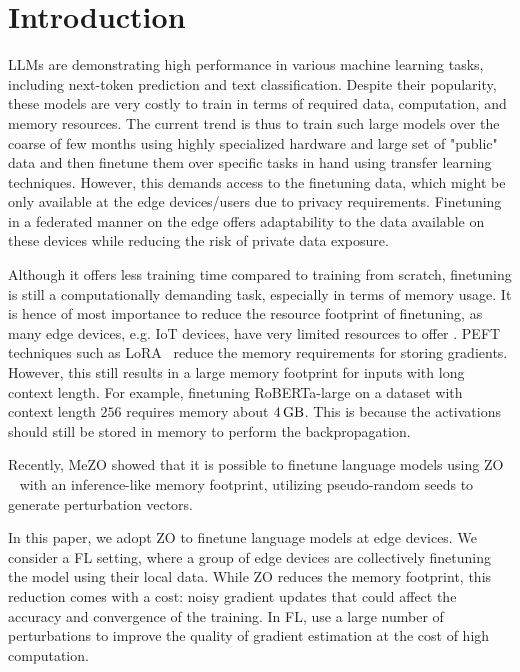 \section{Introduction}

LLMs are demonstrating high performance in various machine learning tasks, including next-token prediction and text classification. Despite their popularity, these models are very costly to train in terms of required data, computation, and memory resources. The current trend is thus to train such large models over the coarse of few months using highly specialized hardware and large set of "public" data and then finetune them over specific tasks in hand using transfer learning techniques. However, this demands access to the finetuning data, which might be only available at the edge devices/users due to privacy requirements. Finetuning in a federated \cite{mcmahan2017communication} manner on the edge offers adaptability to the data available on these devices while reducing the risk of private data exposure.

Although it offers less training time compared to training from scratch, finetuning is still a computationally demanding task, especially in terms of memory usage. It is hence of most importance to reduce the resource footprint of finetuning, as many edge devices, e.g. IoT devices, have very limited resources to offer \cite{Survey_2, pfeiffer2023federated}. \ac{PEFT} techniques such as LoRA~\cite{hu2022lora} reduce the memory requirements for storing gradients. However, this still results in a large memory footprint for inputs with long context length. For example, finetuning RoBERTa-large \cite{roberta_cite} on a dataset with context length $256$ requires memory about $\SI{4}{\giga \byte}$. This is because the activations should still be stored in memory to perform the backpropagation. 

Recently, MeZO \cite{malladi2023fine} showed that it is possible to finetune language models using \ac{ZO} ~\cite{spsa_cite} with an inference-like memory footprint, utilizing pseudo-random seeds to generate perturbation vectors. 

In this paper, we adopt \ac{ZO} to finetune language models at edge devices. We consider a \ac{FL} setting, where a group of edge devices are collectively finetuning the model using their local data. While \ac{ZO} reduces the memory footprint, this reduction comes with a cost: noisy gradient updates that could affect the accuracy and convergence of the training. In \ac{FL}, \cite{decomfl_cite, fang2022communication} use a large number of perturbations to improve the quality of gradient estimation at the cost of high computation. 



